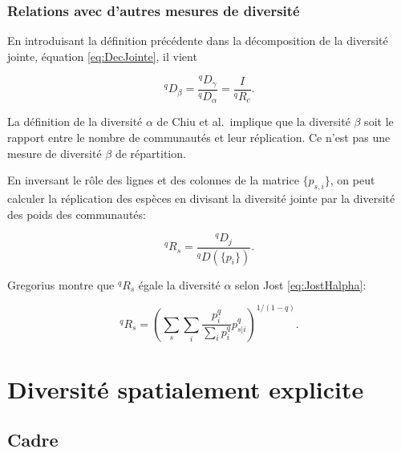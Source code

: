 \documentclass[
  11pt,
  french,
  a4paper,
  extrafontsizes,onecolumn,openright
  ]{memoir}
\begin{document}
\hypertarget{relations-avec-dautres-mesures-de-diversituxe9}{%
\section{Relations avec d'autres mesures de diversité}\label{relations-avec-dautres-mesures-de-diversituxe9}}

En introduisant la définition précédente dans la décomposition de la diversité jointe, équation \eqref{eq:DecJointe}, il vient

\begin{equation}
  \label{eq:DqbetaChiu}
  ^{q}\!D_{\beta}
  = \frac{^{q}\!D_{\gamma}}{^{q}\!D_{\alpha}}
  = \frac{I}{^{q}\!R_{c}}.
\end{equation}

La définition de la diversité \(\alpha\) de Chiu et al.~implique que la diversité \(\beta\) soit le rapport entre le nombre de communautés et leur réplication.
Ce n'est pas une mesure de diversité \(\beta\) de répartition.

En inversant le rôle des lignes et des colonnes de la matrice \(\{p_{s,i}\}\), on peut calculer la réplication des espèces en divisant la diversité jointe par la diversité des poids des communautés:

\begin{equation}
  \label{eq:Replication}
  ^{q}\!R_{s}
  = \frac{^{q}\!D_{j}}{^{q}\!D\left(\{p_{i}\}\right)}.
\end{equation}

Gregorius montre que \(^{q}\!R_{s}\) égale la diversité \(\alpha\) selon Jost \eqref{eq:JostHalpha}:

\begin{equation}
  \label{eq:JostGregorius}
  ^{q}\!R_{s}
  = {\left(\sum_s{\sum_i{\frac{p^q_i}{\sum_i{p^q_i}}p^q_{s|i}}}\right)}^{{1}/{\left(1-q\right)}}.
\end{equation}

\hypertarget{part-diversituxe9-spatialement-explicite}{%
\part{Diversité spatialement explicite}\label{part-diversituxe9-spatialement-explicite}}

\hypertarget{sec:spatialCadre}{%
\chapter{Cadre}\label{sec:spatialCadre}}
\end{document}

